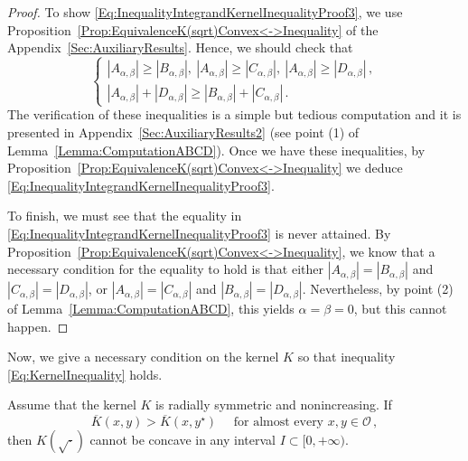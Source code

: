 \begin{proof}
To show \eqref{Eq:InequalityIntegrandKernelInequalityProof3}, we use Proposition~\ref{Prop:EquivalenceK(sqrt)Convex<->Inequality} of the Appendix~\ref{Sec:AuxiliaryResults}. Hence, we should check that
$$
\begin{cases}
|A_{\alpha,\beta}| \geq |B_{\alpha,\beta}|,\ |A_{\alpha,\beta}| \geq |C_{\alpha,\beta}|, \ |A_{\alpha,\beta}| \geq |D_{\alpha,\beta}|\,, \\
|A_{\alpha,\beta}| + |D_{\alpha,\beta}| \geq |B_{\alpha,\beta}| + |C_{\alpha,\beta}|\,.
\end{cases}
$$
The verification of these inequalities is a simple but tedious computation and it is presented in Appendix~\ref{Sec:AuxiliaryResults2} (see point (1) of Lemma~\ref{Lemma:ComputationABCD}). Once we have these inequalities, by Proposition~\ref{Prop:EquivalenceK(sqrt)Convex<->Inequality} we deduce \eqref{Eq:InequalityIntegrandKernelInequalityProof3}.

To finish, we must see that the equality in \eqref{Eq:InequalityIntegrandKernelInequalityProof3} is never attained. By Proposition~\ref{Prop:EquivalenceK(sqrt)Convex<->Inequality}, we know that a necessary condition for the equality to hold is that either $|A_{\alpha,\beta}| = |B_{\alpha,\beta}|$ and $|C_{\alpha,\beta}| = |D_{\alpha,\beta}|$, or $|A_{\alpha,\beta}| = |C_{\alpha,\beta}|$ and $|B_{\alpha,\beta}| = |D_{\alpha,\beta}|$. Nevertheless, by point (2) of Lemma~\eqref{Lemma:ComputationABCD}, this yields $\alpha = \beta = 0$, but this cannot happen.
\end{proof}


Now, we give a necessary condition on the kernel $K$ so that inequality \eqref{Eq:KernelInequality} holds.

\begin{proposition}
\label{Prop:KernelInequalityNecessaryCondition} Assume that the kernel $K$ is radially symmetric and
nonincreasing. If
\begin{equation}
\label{Eq:KernelInequalityAE}
\overline{K}(x,y) > \overline{K}(x, y^\star) \quad \text{ for almost every }x,y \in \mathcal{O}\,,
\end{equation}
then $K(\sqrt{\cdot})$ cannot be concave in any interval $I\subset [0,+\infty)$.
\end{proposition}

